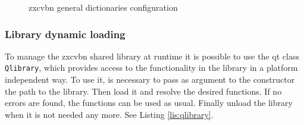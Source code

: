 \begin{figure}[ht]
  \centering
  \caption{zxcvbn general dictionaries configuration}
 \label{fig:zxcvbnGen}
\end{figure}

\subsubsection{Library dynamic loading}

To manage the zxcvbn shared library at runtime it is possible to use the qt class \texttt{Qlibrary}, which provides access to the functionality in the library in a platform independent way. To use it, is necessary to pass as argument to the constructor the path to the library. Then load it and resolve the desired functions. If no errors are found, the functions can be used as usual. Finally unload the library when it is not needed any more. See Listing \ref{lis:qlibrary}.


